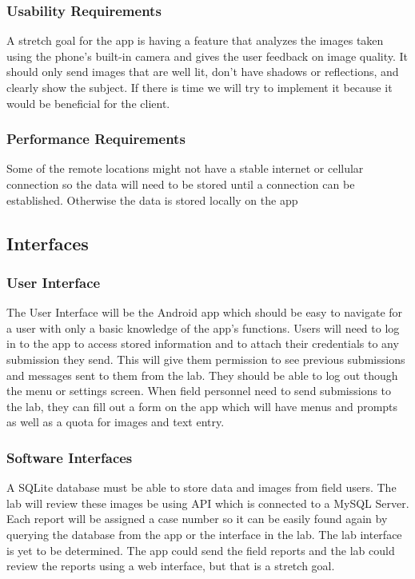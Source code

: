 \documentclass[onecolumn, draftclsnofoot,10pt, compsoc]{IEEEtran}
\begin{document}
\subsubsection{Usability Requirements}
A stretch goal for the app is having a feature that analyzes the images taken using the phone's built-in camera and gives the user feedback on image quality. 
It should only send images that are well lit, don’t have shadows or reflections, and clearly show the subject. 
If there is time we will try to implement it because it would be beneficial for the client. 

\subsubsection{Performance Requirements}
Some of the remote locations might not have a stable internet or cellular connection so the data will need to be stored until a connection can be established. Otherwise the data is stored locally on the app 

\subsection{Interfaces}
\subsubsection{User Interface}
The User Interface will be the Android app which should be easy to navigate for a user with only a basic knowledge of the app's functions. 
\newline
Users will need to log in to the app to access stored information and to attach their credentials to any submission they send. 
This will give them permission to see previous submissions and messages sent to them from the lab. They should be able to log out though the menu or settings screen. 
When field personnel need to send submissions to the lab, they can fill out a form on the app which will have menus and prompts as well as a quota for images and text entry.

\subsubsection{Software Interfaces}
A SQLite database must be able to store data and images from field users.
The lab will review these images be using API which is connected to a MySQL Server. 
Each report will be assigned a case number so it can be easily found again by querying the database from the app or the interface in the lab. 
The lab interface is yet to be determined. 
The app could send the field reports and the lab could review the reports using  a web interface, but that is a stretch goal. 
\end{document}
